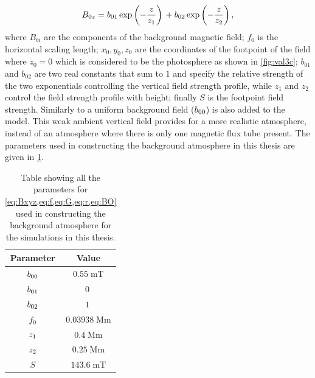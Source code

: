 \documentclass[a4paper,12pt,fourier,authoryear,custommargin]{Classes/PhDThesisPSnPDF}
\providecommand{\DIFaddtex}[1]{{\protect\color{blue}\uwave{#1}}} %
\providecommand{\DIFaddbegin}{} %
\providecommand{\DIFaddend}{} %
\providecommand{\DIFadd}[1]{\texorpdfstring{\DIFaddtex{#1}}{#1}} %
\begin{document}
\begin{equation}\label{eq:BO}
{B_{0z}} =
{b_{01}}\exp\left(-\frac{z}{{z_{1}}}\right)\,
+
{b_{02}}\exp\left(-\frac{z}{{z_{2}}}\right),
\end{equation}
where $B_{bi}$ are the components of the background magnetic field; $f_0$ is the horizontal scaling length; $x_0,y_0,z_0$ are the coordinates of the footpoint of the field where $z_0=0$ which is considered to be the photosphere as shown in \cref{fig:val3c}; $b_{01}$ and $b_{02}$ are two real constants that sum to $1$ and specify the relative strength of the two exponentials controlling the vertical field strength profile, while $z_1$ and $z_2$ control the field strength profile with height; finally $S$ is the footpoint field strength.
Similarly to\DIFaddbegin \DIFadd{~}\DIFaddend \cite{gent2014} a uniform background field (${b_{00}}$) is also added to the model.
This weak ambient vertical field provides for a more realistic atmosphere, instead of an atmosphere where there is only one magnetic flux tube present.
The parameters used in constructing the background atmosphere in this thesis are given in \cref{tab:bgparams}.

\begin{table}
    \centering
    \begin{tabular}{|c|c|}
        \hline Parameter & Value \\
        \hline ${b_{00}}$ & $0.55 \; \mathrm{mT}$
\\
        \hline ${b_{01}}$ & $0 \; \mathrm{}$
\\
        \hline ${b_{02}}$ & $1 \; \mathrm{}$
\\
        \hline $f_0$ & $0.03938 \; \mathrm{Mm}$
\\
        \hline ${z_{1}}$ & $0.4 \; \mathrm{Mm}$
\\
        \hline ${z_{2}}$ & $0.25 \; \mathrm{Mm}$
\\
        \hline $S$   & $143.6 \; \mathrm{mT}$
\\
        \hline
    \end{tabular}

    \caption{Table showing all the parameters for \cref{eq:Bxyz,eq:f,eq:G,eq:r,eq:BO} used in constructing the background atmosphere for the simulations in this thesis.}
    \label{tab:bgparams}
\end{table}
\end{document}
